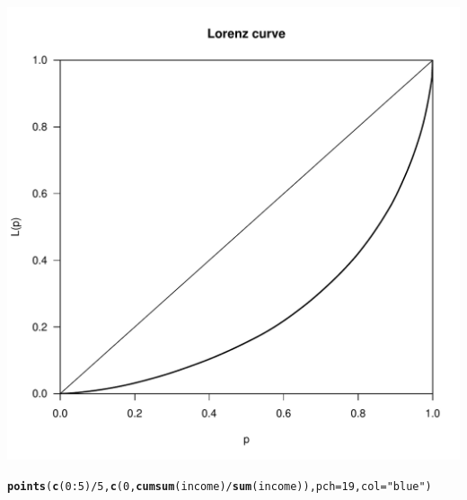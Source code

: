 \documentclass[12pt, a4paper, oneside]{article}\usepackage[]{graphicx}\usepackage[]{color}
\makeatletter
\def\maxwidth{ %
  \ifdim\Gin@nat@width>\linewidth
    \linewidth
  \else
    \Gin@nat@width
  \fi
}
\newcommand{\hlnum}[1]{\textcolor[rgb]{0.686,0.059,0.569}{#1}}%
\newcommand{\hlstr}[1]{\textcolor[rgb]{0.192,0.494,0.8}{#1}}%
\newcommand{\hlopt}[1]{\textcolor[rgb]{0,0,0}{#1}}%
\newcommand{\hlstd}[1]{\textcolor[rgb]{0.345,0.345,0.345}{#1}}%
\newcommand{\hlkwc}[1]{\textcolor[rgb]{0.333,0.667,0.333}{#1}}%
\newcommand{\hlkwd}[1]{\textcolor[rgb]{0.737,0.353,0.396}{\textbf{#1}}}%
\newenvironment{kframe}{%
 \def\at@end@of@kframe{}%
 \ifinner\ifhmode%
  \def\at@end@of@kframe{\end{minipage}}%
  \begin{minipage}{\columnwidth}%
 \fi\fi%
 \def\FrameCommand##1{\hskip\@totalleftmargin \hskip-\fboxsep
 \colorbox{shadecolor}{##1}\hskip-\fboxsep
     \hskip-\linewidth \hskip-\@totalleftmargin \hskip\columnwidth}%
 \MakeFramed {\advance\hsize-\width
   \@totalleftmargin\z@ \linewidth\hsize
   \@setminipage}}%
 {\par\unskip\endMakeFramed%
 \at@end@of@kframe}
\newenvironment{knitrout}{}{} %
\makeatother
\begin{document}
\begin{knitrout}
\includegraphics[width=\maxwidth]{figure/library-1} 
\begin{kframe}\begin{alltt}
\hlkwd{points}\hlstd{(}\hlkwd{c}\hlstd{(}\hlnum{0}\hlopt{:}\hlnum{5}\hlstd{)}\hlopt{/}\hlnum{5}\hlstd{,} \hlkwd{c}\hlstd{(}\hlnum{0}\hlstd{,} \hlkwd{cumsum}\hlstd{(income)}\hlopt{/}\hlkwd{sum}\hlstd{(income)),} \hlkwc{pch} \hlstd{=} \hlnum{19}\hlstd{,} \hlkwc{col} \hlstd{=} \hlstr{"blue"}\hlstd{)}
\end{alltt}


{\ttfamily\noindent\bfseries\color{errorcolor}{\#\# Error in xy.coords(x, y): 'x' and 'y' lengths differ}}\end{kframe}
\end{knitrout}
\end{document}
